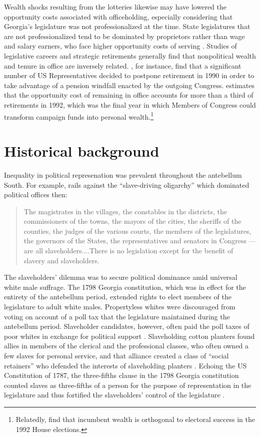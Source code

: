 Wealth shocks resulting from the lotteries likewise may have lowered the opportunity costs associated with officeholding, especially considering that Georgia's legislature was not professionalized at the time. State legislatures that are not professionalized tend to be dominated by proprietors rather than wage and salary earners, who face higher opportunity costs of serving \citep{fiorina1994,fiorina1999}. Studies of legislative careers and strategic retirements generally find that nonpolitical wealth and tenure in office are inversely related. \citet{hall1995}, for instance, find that a significant number of US Representatives decided to postpone retirement in 1990 in order to take advantage of a pension windfall enacted by the outgoing Congress. \citet{groseclose1994} estimates that the opportunity cost of remaining in office accounts for more than a third of retirements in 1992, which was the final year in which Members of Congress could transform campaign funds into personal wealth.\footnote{Relatedly, \citet{milyo1999electoral} find that incumbent wealth is orthogonal to electoral success in the 1992 House elections.}

\section{Historical background} \label{history-ch2} 

Inequality in political represenation was prevalent throughout the antebellum South. For example, \citet{helper1860} rails against the ``slave-driving oligarchy'' which dominated political offices then: 
%
	\begin{quotation}The magistrates in the villages, the constables in the districts, the commissioners of the towns, the mayors of the cities, the sheriffs of the counties, the judges of the various courts, the members of the legislatures, the governors of the States, the representatives and senators in Congress --- are all slaveholders....There is no legislation except for the benefit of slavery and slaveholders.
	\end{quotation}  
%
The slaveholders' dilemma was to secure political dominance amid universal white male suffrage. The 1798 Georgia constitution, which was in effect for the entirety of the antebellum period, extended rights to elect members of the legislature to adult white males. Propertyless whites were discouraged from voting on account of a poll tax that the legislature maintained during the antebellum period. Slaveholder candidates, however, often paid the poll taxes of poor whites in exchange for political support \citep{meyers2012}. Slaveholding cotton planters found allies in members of the clerical and the professional classes, who often owned a few slaves for personal service, and that alliance created a class of ``social retainers'' who defended the interests of slaveholding planters \citep{simons1912}. Echoing the US Constitution of 1787, the three-fifths clause in the 1798 Georgia constitution counted slaves as three-fifths of a person for the purpose of representation in the legislature and thus fortified the slaveholders' control of the legislature \citep{coulter1960}.

